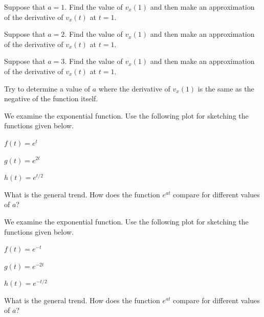 \begin{problem}
  \begin{subproblem}
  \item Suppose that $a=1$. Find the value of $v_x(1)$ and then make
    an approximation of the derivative of $v_x(t)$ at $t=1$.  
    \vfill
    \item Suppose that $a=2$. Find the value of $v_x(1)$ and then make
    an approximation of the derivative of $v_x(t)$ at $t=1$.  
    \vfill
    \item Suppose that $a=3$. Find the value of $v_x(1)$ and then make
    an approximation of the derivative of $v_x(t)$ at $t=1$.  
    \vfill
    \item Try to determine a value of $a$ where the derivative of
      $v_x(1)$ is the same as the negative of the function itself.
      \vfill
  \end{subproblem}

  \clearpage

\item We examine the exponential function. Use the following plot for
  sketching the functions given below.

  \scalebox{0.75}{}

  \begin{subproblem}
  \item $f(t) = e^t$
  \item $g(t) = e^{2t}$
  \item $h(t) = e^{t/2}$
  \item What is the general trend. How does the function $e^{at}$
    compare for different values of $a$?
  \end{subproblem}

  \clearpage

\item We examine the exponential function. Use the following plot for
  sketching the functions given below.

  \scalebox{0.75}{}

  \begin{subproblem}
  \item $f(t) = e^{-t}$
  \item $g(t) = e^{-2t}$
  \item $h(t) = e^{-t/2}$
  \item What is the general trend. How does the function $e^{at}$
    compare for different values of $a$?
  \end{subproblem}



\end{problem}

